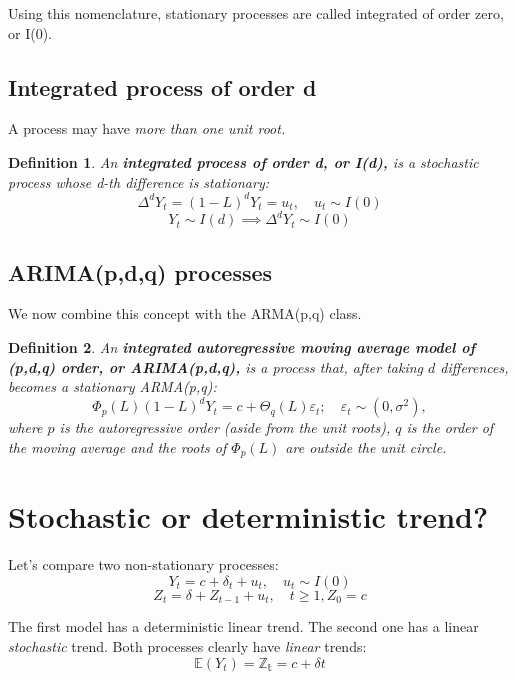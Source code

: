 \documentclass[11pt, a4paper]{report}
\theoremstyle{plain}
\theoremstyle{plain}
\newtheorem{defn}{Definition}[section]
\theoremstyle{remark}
\begin{document}
Using this nomenclature, stationary processes are called integrated of order zero, or I(0).

\subsection{Integrated process of order d}

A process may have \textit{more than one unit root.} 

\begin{defn}
	An \textbf{integrated process of order d, or I(d),} is a stochastic process whose d-th difference is stationary:
	$$ \Delta^d Y_t = (1-L)^d Y_t = u_t, \hspace{1em} u_t \sim I(0) $$
	$$ Y_t \sim I(d) \implies \Delta^d Y_t \sim I(0) $$
\end{defn}

\subsection{ARIMA(p,d,q) processes}

We now combine this concept with the ARMA(p,q) class.

\begin{defn}
	An \textbf{integrated autoregressive moving average model of (p,d,q) order, or ARIMA(p,d,q),} is a process that, after taking $d$ differences, becomes a stationary ARMA(p,q):
	$$\Phi_{p}(L)(1-L)^{d} Y_{t}=c+\Theta_{q}(L) \varepsilon_{t} ; \quad \varepsilon_{t} \sim\left(0, \sigma^{2}\right),$$
	where $p$ is the autoregressive order (aside from the unit roots), $q$ is the order of the moving average and the roots of $\Phi_{p}(L)$ are outside the unit circle.
\end{defn}

\section{Stochastic or deterministic trend?}

Let's compare two non-stationary processes:
$$ Y_t = c + \delta_{t} + u_t, \hspace{1em} u_t \sim I(0) $$
$$ Z_t = \delta + Z_{t-1} + u_t, \hspace{1em} t \geq 1, Z_0 = c$$

The first model has a deterministic linear trend. The second one has a linear \textit{stochastic} trend. Both processes clearly have \textit{linear} trends:
$$ \mathbb{E}(Y_t) = \mathbb{Z_t} = c + \delta t $$
\end{document}
